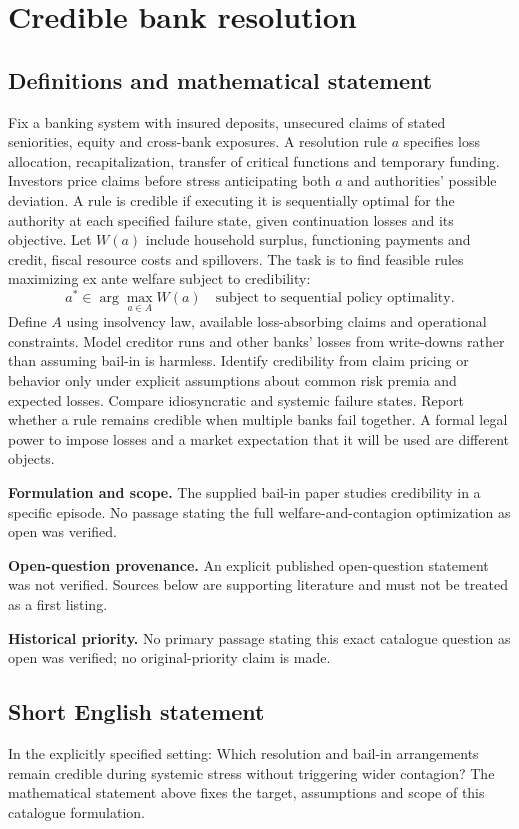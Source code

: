 \documentclass[11pt]{article}
\begin{document}
\section*{Credible bank resolution}\label{30007609}
\subsection{Definitions and mathematical statement}
Fix a banking system with insured deposits, unsecured claims of stated seniorities, equity and cross-bank exposures. A resolution rule \(a\) specifies loss allocation, recapitalization, transfer of critical functions and temporary funding. Investors price claims before stress anticipating both \(a\) and authorities' possible deviation. A rule is credible if executing it is sequentially optimal for the authority at each specified failure state, given continuation losses and its objective. Let \(W(a)\) include household surplus, functioning payments and credit, fiscal resource costs and spillovers. The task is to find feasible rules maximizing ex ante welfare subject to credibility:
\[a^*\in\arg\max_{a\in A}W(a)\quad\text{subject to sequential policy optimality}.\]
Define \(A\) using insolvency law, available loss-absorbing claims and operational constraints. Model creditor runs and other banks' losses from write-downs rather than assuming bail-in is harmless. Identify credibility from claim pricing or behavior only under explicit assumptions about common risk premia and expected losses. Compare idiosyncratic and systemic failure states. Report whether a rule remains credible when multiple banks fail together. A formal legal power to impose losses and a market expectation that it will be used are different objects.

\par\textbf{Formulation and scope.} The supplied bail-in paper studies credibility in a specific episode. No passage stating the full welfare-and-contagion optimization as open was verified.

\par\textbf{Open-question provenance.} An explicit published open-question statement was not verified. Sources below are supporting literature and must not be treated as a first listing.

\par\textbf{Historical priority.} No primary passage stating this exact catalogue question as open was verified; no original-priority claim is made.

\subsection{Short English statement}
In the explicitly specified setting: Which resolution and bail-in arrangements remain credible during systemic stress without triggering wider contagion? The mathematical statement above fixes the target, assumptions and scope of this catalogue formulation.
\end{document}
